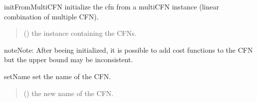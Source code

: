\documentclass[letterpaper,10pt,openany,oneside,english]{sphinxmanual}
\begin{document}
\begin{fulllineitems}

\begin{fulllineitems}
\label{\detokenize{ref/ref_python:pytoulbar2.CFN.initFromMultiCFN}}
\pysigstartsignatures
{}
\pysigstopsignatures
\sphinxAtStartPar
initFromMultiCFN initialize the cfn from a multiCFN instance (linear combination of multiple CFN).
\begin{quote}\begin{description}
\sphinxAtStartPar
{} () \textendash{} the instance containing the CFNs.

\end{description}\end{quote}

\begin{sphinxadmonition}{note}{Note:}
\sphinxAtStartPar
After beeing initialized, it is possible to add cost functions to the CFN but the upper bound may be inconsistent.
\end{sphinxadmonition}

\end{fulllineitems}


\begin{fulllineitems}
\label{\detokenize{ref/ref_python:pytoulbar2.CFN.setName}}
\pysigstartsignatures
{}
\pysigstopsignatures
\sphinxAtStartPar
setName set the name of the CFN.
\begin{quote}\begin{description}
\sphinxAtStartPar
{} () \textendash{} the new name of the CFN.

\end{description}\end{quote}

\end{fulllineitems}


\end{fulllineitems}




\renewcommand{\indexname}{Index}
\printindex
\end{document}

